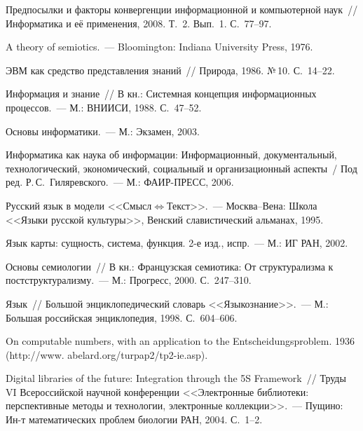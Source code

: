 \begin{multicols}{2}
{{\begin{thebibliography}{99}
     Предпосылки и факторы конвергенции информационной и компьютерной наук~// 
Информатика и её применения, 2008. Т.~2. Вып.~1. С.~77--97.
     
     A theory of semiotics.~--- Bloomington: Indiana University Press, 1976.
     
     ЭВМ как средство представления знаний~// Природа, 1986. №\,10. С.~14--22.
  
   
     Информация и знание~// В кн.: Сис\-тем\-ная концепция информационных процессов.~--- 
М.: ВНИИСИ, 1988. С.~47--52.

     Основы информатики.~--- М.: Экзамен, 2003.
     
Информатика как наука об информации: Инфор\-мационный, документальный, 
технологический, экономический, социальный и организационный аспекты~/ Под ред. 
Р.\,С.~Гиляревского.~--- М.: ФАИР-ПРЕСС, 2006.
     
    
     Русский язык в модели <<Смысл$\Leftrightarrow$Текст>>.~--- Москва--Вена: Школа 
<<Языки русской культуры>>, Венский славистический альманах, 1995.
     
     Язык карты: сущность, система, функция. 2-е изд., испр.~--- М.: ИГ РАН, 2002.
     
     Основы семиологии~// В кн.: Французская семиотика: От структурализма к 
постструктурализму.~--- М.: Прогресс, 2000. С.~247--310.
     
     Язык~// Большой энциклопедический словарь <<Языкознание>>.~--- М.: Большая 
российская энциклопедия, 1998. С.~604--606. 
     
     On computable numbers, with an application to the Entscheidungsproblem. 
1936 ({\sf http://www. abelard.org/turpap2/tp2-ie.asp}).
     
     Digital libraries of the future: Integration through the 5S Framework~// Труды VI 
Всероссийской научной конференции <<Электронные библиотеки: перспективные методы и 
технологии, электронные коллекции>>.~--- Пущино: Ин-т математических проблем 
биологии РАН, 2004. С.~1--2.
     

\end{thebibliography}}}
\end{multicols}
